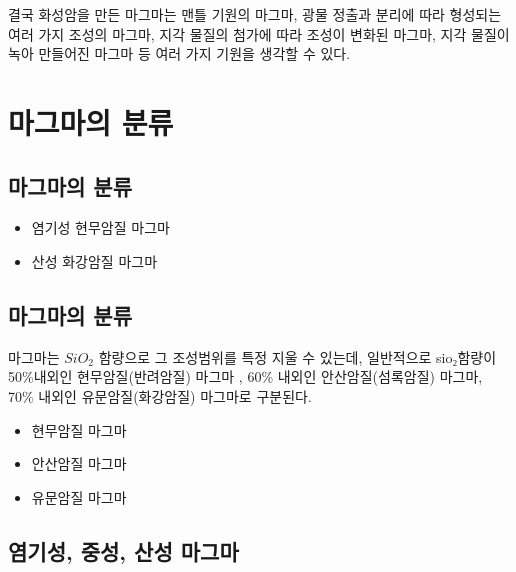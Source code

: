 \documentclass[12pt, a4paper, twoside]{book}
\begin{document}
				결국 화성암을 만든 마그마는 맨틀 기원의 마그마, 광물 정출과 분리에 따라 형성되는 여러 가지 조성의 마그마, 지각 물질의 첨가에 따라 조성이 변화된 마그마, 지각 물질이 녹아 만들어진 마그마 등 여러 가지 기원을 생각할 수 있다.



	\clearpage
	\section{마그마의 분류}




	\subsection{마그마의 분류}


				\begin{itemize}[topsep=0.0em, parsep=0.0em, itemsep=0em, leftmargin=12.0em, labelwidth=3em, labelsep=3em] 
				\item	염기성 현무암질 마그마
				\item	산성 화강암질 마그마
				\end{itemize}




	\subsection{마그마의 분류}

			마그마는 $SiO_2$ 함량으로 그 조성범위를 특정 지울 수 있는데, 일반적으로 sio₂함량이 50\%내외인 현무암질(반려암질) 마그마 , 60\% 내외인 안산암질(섬록암질) 마그마, 70\% 내외인 유문암질(화강암질) 마그마로 구분된다. 

				\begin{itemize}[topsep=0.0em, parsep=0.0em, itemsep=0em, leftmargin=12.0em, labelwidth=3em, labelsep=3em] 
				\item	현무암질 마그마
				\item	안산암질 마그마
				\item	유문암질 마그마
				\end{itemize}



	\clearpage  \null
	\subsection{염기성, 중성, 산성 마그마}
\end{document}
